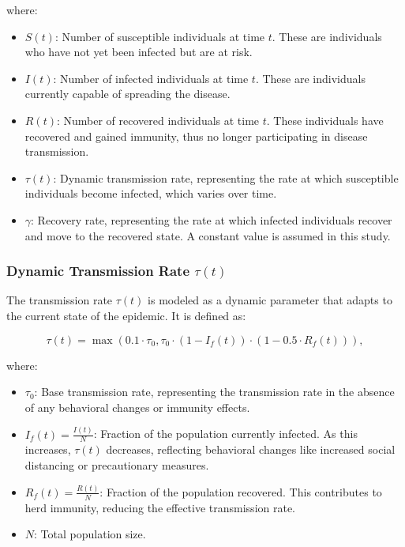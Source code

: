 \documentclass[12pt,a4paper]{article}
\begin{document}
where:
\begin{itemize}
    \item \(S(t)\): Number of susceptible individuals at time \(t\). These are individuals who have not yet been infected but are at risk.
    \item \(I(t)\): Number of infected individuals at time \(t\). These are individuals currently capable of spreading the disease.
    \item \(R(t)\): Number of recovered individuals at time \(t\). These individuals have recovered and gained immunity, thus no longer participating in disease transmission.
    \item \(\tau(t)\): Dynamic transmission rate, representing the rate at which susceptible individuals become infected, which varies over time.
    \item \(\gamma\): Recovery rate, representing the rate at which infected individuals recover and move to the recovered state. A constant value is assumed in this study.
\end{itemize}

\subsubsection*{Dynamic Transmission Rate \(\tau(t)\)}
The transmission rate \(\tau(t)\) is modeled as a dynamic parameter that adapts to the current state of the epidemic. It is defined as:

\begin{equation}
    \tau(t) = \max\left(0.1 \cdot \tau_0, \tau_0 \cdot (1 - I_f(t)) \cdot (1 - 0.5 \cdot R_f(t))\right),
\end{equation}

where:
\begin{itemize}
    \item \(\tau_0\): Base transmission rate, representing the transmission rate in the absence of any behavioral changes or immunity effects.
    \item \(I_f(t) = \frac{I(t)}{N}\): Fraction of the population currently infected. As this increases, \(\tau(t)\) decreases, reflecting behavioral changes like increased social distancing or precautionary measures.
    \item \(R_f(t) = \frac{R(t)}{N}\): Fraction of the population recovered. This contributes to herd immunity, reducing the effective transmission rate.
    \item \(N\): Total population size.
\end{itemize}
\end{document}
